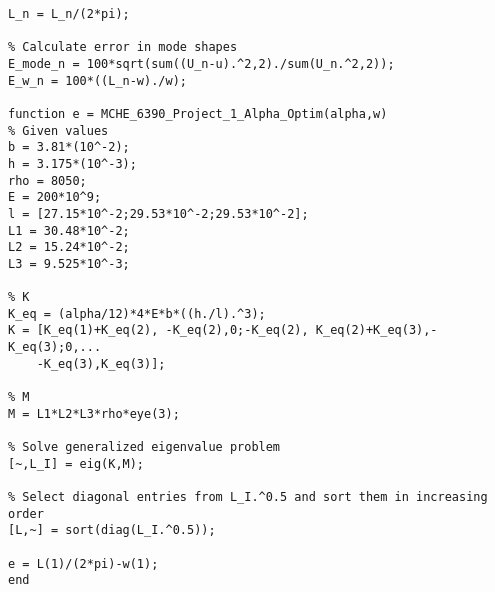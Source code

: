 \documentclass{article}
\begin{document}
\begin{lstlisting}[style=Matlab-editor]
L_n = L_n/(2*pi);

% Calculate error in mode shapes
E_mode_n = 100*sqrt(sum((U_n-u).^2,2)./sum(U_n.^2,2));
E_w_n = 100*((L_n-w)./w);

function e = MCHE_6390_Project_1_Alpha_Optim(alpha,w)
% Given values
b = 3.81*(10^-2);
h = 3.175*(10^-3);
rho = 8050;
E = 200*10^9;
l = [27.15*10^-2;29.53*10^-2;29.53*10^-2];
L1 = 30.48*10^-2;
L2 = 15.24*10^-2;
L3 = 9.525*10^-3;

% K
K_eq = (alpha/12)*4*E*b*((h./l).^3);
K = [K_eq(1)+K_eq(2), -K_eq(2),0;-K_eq(2), K_eq(2)+K_eq(3),-K_eq(3);0,...
    -K_eq(3),K_eq(3)];
      
% M
M = L1*L2*L3*rho*eye(3);

% Solve generalized eigenvalue problem
[~,L_I] = eig(K,M);

% Select diagonal entries from L_I.^0.5 and sort them in increasing order
[L,~] = sort(diag(L_I.^0.5));

e = L(1)/(2*pi)-w(1);
end
\end{lstlisting}
\end{document}
